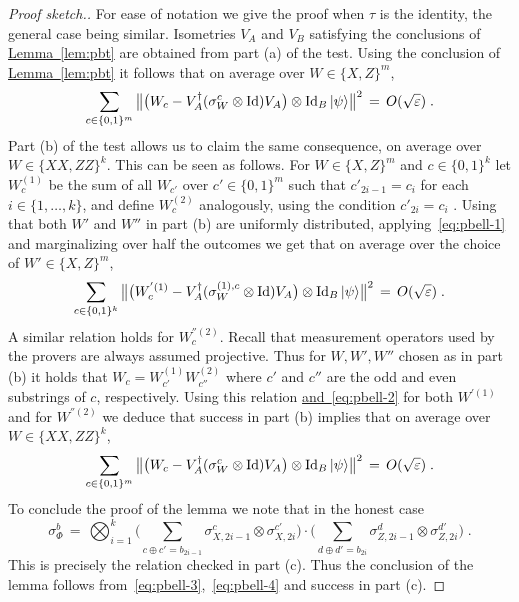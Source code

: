\documentclass[11pt]{article}
\numberwithin{equation}{section}
\theoremstyle{definition}
\theoremstyle{plain}
\newcommand{\expref}[2]{\hyperref[#2]{#1~\ref{#2}}}
\newcommand{\expeqref}[2]{\hyperref[#2]{#1~\eqref{#2}}}
\newcommand{\ket}[1]{|#1\rangle}
\newcommand{\Id}{\ensuremath{\mathop{\rm Id}\nolimits}}
\newcommand{\eps}{\varepsilon}
\begin{document}
\begin{proof}[Proof sketch.]
For ease of notation we give the proof when $\tau$ is the identity, the general case being similar. 
Isometries $V_A$ and $V_B$ satisfying the conclusions of 
\expref{Lemma}{lem:pbt} are obtained from part (a) of the test. Using the conclusion of \expref{Lemma}{lem:pbt} it follows that on average over $W\in\{X,Z\}^m$, 
\begin{equation}\label{eq:pbell-1}
 \sum_{c\in\{0,1\}^m} \big\| \big(W_c -V_A^\dagger (\sigma_W^c \otimes \Id) V_A\big) \otimes \Id_B \ket{\psi} \big\|^2 \,=\, O(\sqrt{\eps})\;.
\end{equation}
Part (b) of the test allows us to claim the same consequence, on average over $W\in\{XX,ZZ\}^k$. This can be seen as follows. For $W\in\{X,Z\}^m$ and $c\in\{0,1\}^k$ let $W^{(1)}_c$ be the sum of all $W_{c'}$ over $c'\in\{0,1\}^m$ such that $c'_{2i-1}=c_i$ for each $i\in \{1,\ldots,k\}$, and define $W^{(2)}_c$ analogously, using the condition $c'_{2i}=c_i$ . Using that both $W'$ and $W''$ in part (b) are uniformly distributed, applying~\eqref{eq:pbell-1} and marginalizing over half the outcomes we get that on average over the choice of $W'\in\{X,Z\}^m $,
\begin{equation}\label{eq:pbell-2}
 \sum_{c\in\{0,1\}^k} \big\| \big(W^{'(1)}_c -V_A^\dagger (\sigma_W^{(1),c} \otimes \Id) V_A\big) \otimes \Id_B \ket{\psi} \big\|^2 \,=\, O(\sqrt{\eps})\;.
\end{equation}
A similar relation holds for $W^{''(2)}_c$. Recall that measurement operators used by the provers are always assumed projective. Thus for $W,W',W''$ chosen as in part (b) it holds that $W_c = W^{(1)}_{c'} W^{(2)}_{c''}$ where $c'$ and $c''$ are the odd and even substrings of $c$, respectively.
%
Using this relation \expeqref{and}{eq:pbell-2} for both $W^{'(1)}$ and for $W^{''(2)}$ we deduce that success in part (b) implies that on average over $W\in\{XX,ZZ\}^k$,
\begin{equation}\label{eq:pbell-3}
 \sum_{c\in\{0,1\}^m} \big\| \big(W_c -V_A^\dagger (\sigma_W^{c }\otimes \Id) V_A\big) \otimes \Id_B \ket{\psi} \big\|^2 \,=\, O(\sqrt{\eps})\;.
\end{equation}
To conclude the proof of the lemma we note that in the honest case
\begin{equation}\label{eq:pbell-4}
 \sigma_{\Phi}^b \,=\, \bigotimes_{i=1}^k \Big( \sum_{c\oplus c' = b_{2i-1}} \sigma_{X,2i-1}^{c}\otimes \sigma_{X,2i}^{c'}\Big)\cdot\Big(\sum_{d\oplus d' = b_{2i} }\sigma_{Z,2i-1}^{d}\otimes \sigma_{Z,2i}^{d'}\Big)\;.
\end{equation}
This is precisely the relation checked in part (c). Thus the conclusion of the lemma follows from~\eqref{eq:pbell-3},~\eqref{eq:pbell-4} and success in part (c).  
\end{proof}
\end{document}
